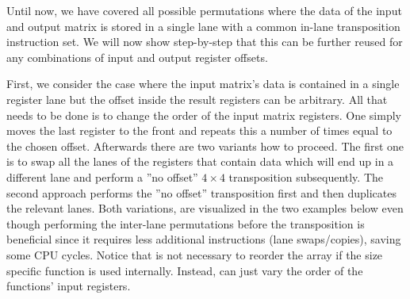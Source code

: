 Until now, we have covered all possible permutations where the data of the input and output matrix is stored in a single lane with a common in-lane transposition instruction set.
We will now show step-by-step that this can be further reused for any combinations of input and output register offsets.

First, we consider the case where the input matrix's data is contained in a single register lane but the offset inside the result registers can be arbitrary.
All that needs to be done is to change the order of the input matrix registers.
One simply moves the last register to the front and repeats this a number of times equal to the chosen offset.
Afterwards there are two variants how to proceed.
The first one is to swap all the lanes of the registers that contain data which will end up in a different lane and perform a ''no offset'' $4 \times 4$ transposition subsequently.
The second approach performs the ''no offset'' transposition first and then duplicates the relevant lanes.
Both variations, are visualized in the two examples below even though performing the inter-lane permutations before the transposition is beneficial since it requires less additional instructions (lane swaps/copies), saving some CPU cycles.
Notice that is not necessary to reorder the array  if the size specific  function is used internally.
Instead, can just vary the order of the functions' input registers.

